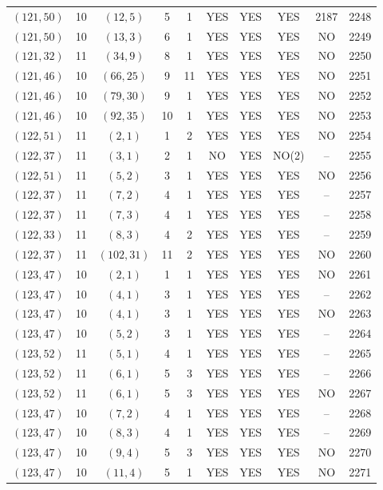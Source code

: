 \begin{longtable}{|c|c|c|c|c|c|c|c|c|c|}
$(121, 50)$ & 10 & $(12, 5)$ & 5 & 1 & YES & YES & YES & 2187 & 2248\\
$(121, 50)$ & 10 & $(13, 3)$ & 6 & 1 & YES & YES & YES & NO & 2249\\
$(121, 32)$ & 11 & $(34, 9)$ & 8 & 1 & YES & YES & YES & NO & 2250\\
$(121, 46)$ & 10 & $(66, 25)$ & 9 & 11 & YES & YES & YES & NO & 2251\\
$(121, 46)$ & 10 & $(79, 30)$ & 9 & 1 & YES & YES & YES & NO & 2252\\
$(121, 46)$ & 10 & $(92, 35)$ & 10 & 1 & YES & YES & YES & NO & 2253\\
$(122, 51)$ & 11 & $(2, 1)$ & 1 & 2 & YES & YES & YES & NO & 2254\\
$(122, 37)$ & 11 & $(3, 1)$ & 2 & 1 & NO & YES & NO(2) & -- & 2255\\
$(122, 51)$ & 11 & $(5, 2)$ & 3 & 1 & YES & YES & YES & NO & 2256\\
$(122, 37)$ & 11 & $(7, 2)$ & 4 & 1 & YES & YES & YES & -- & 2257\\
$(122, 37)$ & 11 & $(7, 3)$ & 4 & 1 & YES & YES & YES & -- & 2258\\
$(122, 33)$ & 11 & $(8, 3)$ & 4 & 2 & YES & YES & YES & -- & 2259\\
$(122, 37)$ & 11 & $(102, 31)$ & 11 & 2 & YES & YES & YES & NO & 2260\\
$(123, 47)$ & 10 & $(2, 1)$ & 1 & 1 & YES & YES & YES & NO & 2261\\
$(123, 47)$ & 10 & $(4, 1)$ & 3 & 1 & YES & YES & YES & -- & 2262\\
$(123, 47)$ & 10 & $(4, 1)$ & 3 & 1 & YES & YES & YES & NO & 2263\\
$(123, 47)$ & 10 & $(5, 2)$ & 3 & 1 & YES & YES & YES & -- & 2264\\
$(123, 52)$ & 11 & $(5, 1)$ & 4 & 1 & YES & YES & YES & -- & 2265\\
$(123, 52)$ & 11 & $(6, 1)$ & 5 & 3 & YES & YES & YES & -- & 2266\\
$(123, 52)$ & 11 & $(6, 1)$ & 5 & 3 & YES & YES & YES & NO & 2267\\
$(123, 47)$ & 10 & $(7, 2)$ & 4 & 1 & YES & YES & YES & -- & 2268\\
$(123, 47)$ & 10 & $(8, 3)$ & 4 & 1 & YES & YES & YES & -- & 2269\\
$(123, 47)$ & 10 & $(9, 4)$ & 5 & 3 & YES & YES & YES & NO & 2270\\
$(123, 47)$ & 10 & $(11, 4)$ & 5 & 1 & YES & YES & YES & NO & 2271\\

\end{longtable}
